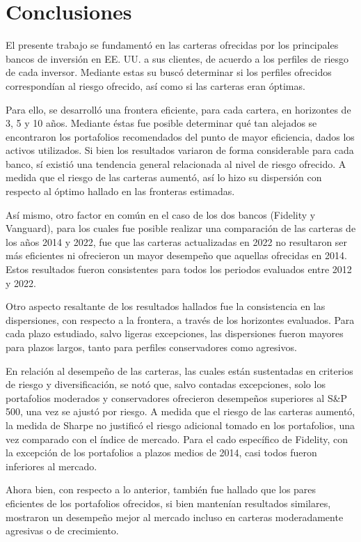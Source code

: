 \documentclass[a4paper,fleqn]{cas-sc}
\begin{document}
\section{Conclusiones}
El presente trabajo se fundamentó en las carteras ofrecidas por los principales bancos de inversión en EE. UU. a sus clientes, de acuerdo a los perfiles de riesgo de cada inversor. Mediante estas su buscó determinar si los perfiles ofrecidos correspondían al riesgo ofrecido, así como si las carteras eran óptimas. 

Para ello, se desarrolló una frontera eficiente, para cada cartera, en horizontes de 3, 5 y 10 años. Mediante éstas fue posible determinar qué tan alejados se encontraron los portafolios recomendados del punto de mayor eficiencia, dados los activos utilizados. 
Si bien los resultados variaron de forma considerable para cada banco, sí existió una tendencia general relacionada al nivel de riesgo ofrecido. A medida que el riesgo de las carteras aumentó, así lo hizo su dispersión con respecto al óptimo hallado en las fronteras estimadas. 

Así mismo, otro factor en común en el caso de los dos bancos (Fidelity y Vanguard), para los cuales fue posible realizar una comparación de las carteras de los años 2014 y 2022, fue que las carteras actualizadas en 2022 no resultaron ser más eficientes ni ofrecieron un mayor desempeño que aquellas ofrecidas en 2014. Estos resultados fueron consistentes para todos los periodos evaluados entre 2012 y 2022.

Otro aspecto resaltante de los resultados hallados fue la consistencia en las dispersiones, con respecto a la frontera, a través de los horizontes evaluados. Para cada plazo estudiado, salvo ligeras excepciones, las dispersiones fueron mayores para plazos largos, tanto para perfiles conservadores como agresivos. 

En relación al desempeño de las carteras, las cuales están sustentadas en criterios de riesgo y diversificación, se notó que, salvo contadas excepciones, solo los portafolios moderados y conservadores ofrecieron desempeños superiores al S\&P 500, una vez se ajustó por riesgo. A medida que el riesgo de las carteras aumentó, la medida de Sharpe no justificó el riesgo adicional tomado en los portafolios, una vez comparado con el índice de mercado. Para el cado específico de Fidelity, con la excepción de los portafolios a plazos medios de 2014, casi todos fueron inferiores al mercado.  

Ahora bien, con respecto a lo anterior, también fue hallado que los pares eficientes de los portafolios ofrecidos, si bien mantenían resultados similares, mostraron un desempeño mejor al mercado incluso en carteras moderadamente agresivas o de crecimiento.  
\end{document}
